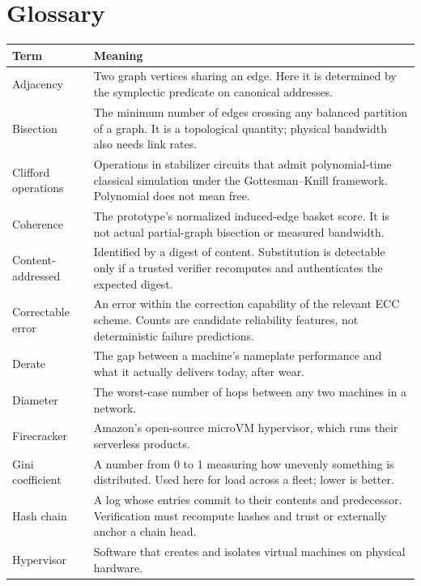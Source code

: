 \documentclass[11pt,letterpaper]{article}
\begin{document}
\newpage

\appendix
\section{Glossary}

\begin{longtable}{@{}p{} p{}@{}}
\toprule
\textbf{Term} & \textbf{Meaning} \\
\midrule
\endhead
Adjacency & Two graph vertices sharing an edge. Here it is determined by the symplectic predicate on canonical addresses.\\
Bisection & The minimum number of edges crossing any balanced partition of a graph. It is a topological quantity; physical bandwidth also needs link rates.\\
Clifford operations & Operations in stabilizer circuits that admit polynomial-time classical simulation under the Gottesman--Knill framework. Polynomial does not mean free.\\
Coherence & The prototype's normalized induced-edge basket score. It is not actual partial-graph bisection or measured bandwidth.\\
Content-addressed & Identified by a digest of content. Substitution is detectable only if a trusted verifier recomputes and authenticates the expected digest.\\
Correctable error & An error within the correction capability of the relevant ECC scheme. Counts are candidate reliability features, not deterministic failure predictions.\\
Derate & The gap between a machine's nameplate performance and what it actually delivers today, after wear.\\
Diameter & The worst-case number of hops between any two machines in a network.\\
Firecracker & Amazon's open-source microVM hypervisor, which runs their serverless products.\\
Gini coefficient & A number from 0 to 1 measuring how unevenly something is distributed. Used here for load across a fleet; lower is better.\\
Hash chain & A log whose entries commit to their contents and predecessor. Verification must recompute hashes and trust or externally anchor a chain head.\\
Hypervisor & Software that creates and isolates virtual machines on physical hardware.\\

\end{longtable}
\end{document}
